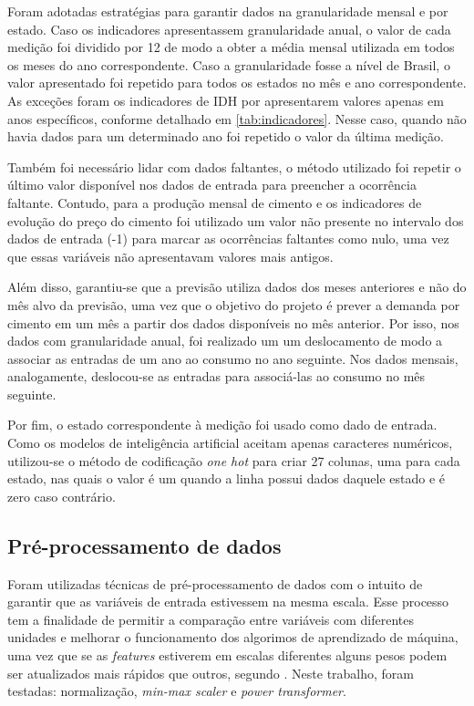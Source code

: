 Foram adotadas estratégias para garantir dados na granularidade
mensal e por estado. Caso os indicadores apresentassem granularidade anual, o valor de
cada medição foi dividido por 12 de modo a obter a média mensal utilizada em 
todos os meses do ano correspondente. Caso a granularidade
fosse a nível de Brasil, o valor apresentado foi repetido para todos os 
estados no mês e ano correspondente. As exceções foram os 
indicadores de IDH por apresentarem valores apenas em anos específicos, conforme 
detalhado em \ref{tab:indicadores}. Nesse caso, quando não havia dados para um 
determinado ano foi repetido o valor da última medição.

Também foi necessário lidar com dados faltantes, o método utilizado foi
repetir o último valor disponível nos dados de entrada para
preencher a ocorrência faltante. Contudo, para a produção mensal de cimento e os 
indicadores de evolução do preço do cimento foi utilizado um valor não 
presente no intervalo dos dados de entrada (-1) para marcar as ocorrências 
faltantes como nulo, uma vez que essas variáveis não apresentavam 
valores mais antigos.

Além disso, garantiu-se que a previsão
 utiliza dados dos meses anteriores e não do mês alvo da
previsão, uma vez que o objetivo do projeto é prever a demanda
por cimento em um mês a partir dos dados disponíveis no mês anterior.
Por isso, nos dados com granularidade anual, foi realizado um um 
deslocamento de modo a associar as entradas de um ano ao consumo no 
ano seguinte. Nos dados mensais, analogamente, deslocou-se as entradas 
para associá-las ao consumo no mês seguinte.

Por fim, o estado correspondente à medição foi usado como dado de entrada. 
Como os modelos de inteligência artificial aceitam apenas caracteres numéricos,
utilizou-se o método de codificação \textit{one hot} para criar 27 colunas, uma
para cada estado, nas quais o valor é um quando a linha possui dados daquele estado 
e é zero caso contrário.


\subsection{Pré-processamento de dados}
\label{sec:norm_dados}

Foram utilizadas técnicas de pré-processamento de dados 
com o intuito de garantir que as variáveis de entrada 
estivessem na mesma escala. Esse processo tem a finalidade de permitir a comparação 
entre variáveis com diferentes unidades e melhorar o funcionamento dos 
algorimos de aprendizado de máquina, uma vez que se as \textit{features} estiverem em escalas diferentes
alguns pesos podem ser atualizados mais rápidos que outros, segundo \citet{Raschka}.
Neste trabalho, foram testadas: normalização, 
\textit{min-max scaler} e \textit{power transformer}.

